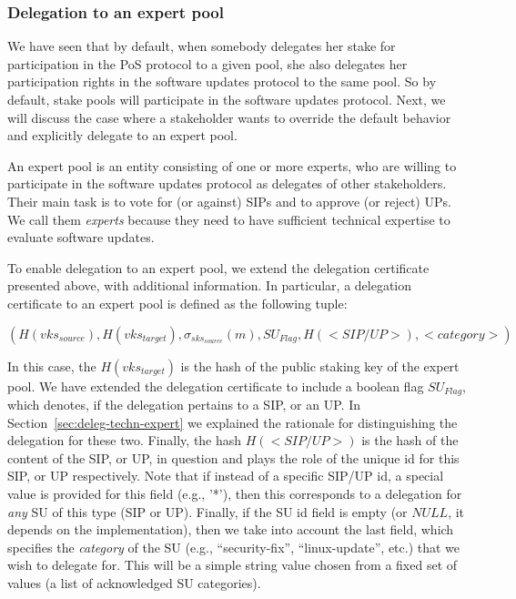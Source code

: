 \documentclass[11pt,a4paper]{article}
\begin{document}
\subsubsection{Delegation to an expert pool}
\label{sec:delegation-an-expert}

We have seen that by default, when somebody delegates her stake for
participation in the PoS protocol to a given pool, she also delegates her
participation rights in the software updates protocol to the same pool.
%
So by default, stake pools will participate in the software updates protocol.
Next, we will discuss the case where a stakeholder wants to override the default
behavior and explicitly delegate to an expert pool.

An expert pool is an entity consisting of one or more experts, who are willing
to participate in the software updates protocol as delegates of other
stakeholders. Their main task is to vote for (or against) SIPs and to approve
(or reject) UPs. We call them \emph{experts} because they need to have
sufficient technical expertise to evaluate software updates.

To enable delegation to an expert pool, we extend the delegation certificate
presented above, with additional information. In particular, a delegation
certificate to an expert pool is defined as the following tuple:

$$
(H(vks_{source}),
 H(vks_{target}),
 \sigma_{sks_{source}}(m),
 SU_{Flag},
 H(<SIP/UP>),
 <category>)
$$

In this case, the $H(vks_{target})$ is the hash of the public staking key of the
expert pool. We have extended the delegation certificate to include a boolean
flag $SU_{Flag}$, which denotes, if the delegation pertains to a SIP, or an UP.
In Section~\ref{sec:deleg-techn-expert} we explained the rationale
for distinguishing the delegation for these two. Finally, the hash $H(<SIP/UP>)$
is the hash of the content of the SIP, or UP, in question and plays the role of
the unique id for this SIP, or UP respectively. Note that if instead of a
specific SIP/UP id, a special value is provided for this field (e.g., '*'), then
this corresponds to a delegation for \emph{any} SU of this type (SIP or UP).
Finally, if the SU id field is empty (or $NULL$, it depends on the
implementation), then we take into account the last field, which specifies the
\emph{category} of the SU (e.g., ``security-fix'', ``linux-update'', etc.)
that we wish to delegate for. This will be a simple string value chosen from a
fixed set of values (a list of acknowledged SU categories).
\end{document}
